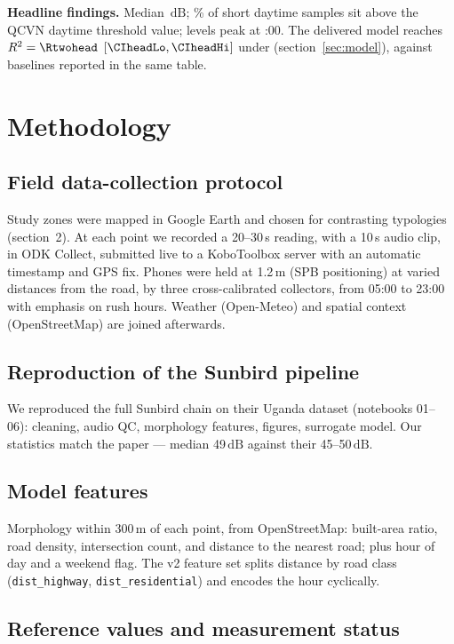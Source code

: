 \documentclass[11pt,a4paper]{article}
\newcommand{\dB}{\ensuremath{\,\mathrm{dB}}}
\begin{document}
\medskip\noindent
\textbf{Headline findings.} Median \dbMedian\dB{}; \excDay\% of short daytime
samples sit above the QCVN daytime threshold value; levels peak at
\peakHour:00. The delivered model reaches $R^2 = \Rtwohead$
$[\CIheadLo, \CIheadHi]$ under  (section~\ref{sec:model}), against
baselines reported in the same table.

\section{Methodology}

\subsection{Field data-collection protocol}

Study zones were mapped in Google Earth and chosen for contrasting typologies
(section~2). At each point we recorded a 20--30\,s reading, with a 10\,s audio
clip, in ODK Collect, submitted live to a KoboToolbox server with an automatic
timestamp and GPS fix. Phones were held at 1.2\,m (SPB positioning) at varied
distances from the road, by three cross-calibrated collectors, from 05:00 to
23:00 with emphasis on rush hours. Weather (Open-Meteo) and spatial context
(OpenStreetMap) are joined afterwards.

\subsection{Reproduction of the Sunbird pipeline}

We reproduced the full Sunbird chain on their Uganda dataset (notebooks 01--06):
cleaning, audio QC, morphology features, figures, surrogate model. Our statistics
match the paper --- median 49\dB{} against their 45--50\dB{}.

\subsection{Model features}

Morphology within 300\,m of each point, from OpenStreetMap: built-area ratio,
road density, intersection count, and distance to the nearest road; plus hour of
day and a weekend flag. The v2 feature set splits distance by road class
(\texttt{dist\_highway}, \texttt{dist\_residential}) and encodes the hour
cyclically.

\subsection{Reference values and measurement status}\label{sec:refs}
\end{document}
